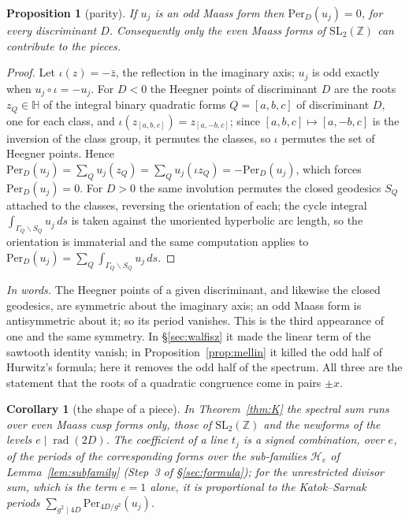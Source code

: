 \documentclass[11pt,a4paper]{article}
\newtheorem{proposition}[theorem]{Proposition}
\newtheorem{corollary}[theorem]{Corollary}
\theoremstyle{remark}\newtheorem{remark}[theorem]{Remark}
\newcommand{\Z}{\mathbb Z}\newcommand{\R}{\mathbb R}\newcommand{\Q}{\mathbb Q}\newcommand{\C}{\mathbb C}
\begin{document}
\begin{proposition}[parity]\label{prop:parity}
If $u_j$ is an odd Maass form then $\mathrm{Per}_D(u_j)=0$, for every discriminant $D$. Consequently only the even
Maass forms of $\mathrm{SL}_2(\Z)$ can contribute to the pieces.
\end{proposition}
\begin{proof}
Let $\iota(z)=-\bar z$, the reflection in the imaginary axis; $u_j$ is odd exactly when $u_j\circ\iota=-u_j$. For
$D<0$ the Heegner points of discriminant $D$ are the roots $z_Q\in\mathbb H$ of the integral binary quadratic forms
$Q=[a,b,c]$ of discriminant $D$, one for each class, and $\iota(z_{[a,b,c]})=z_{[a,-b,c]}$; since $[a,b,c]\mapsto[a,-b,c]$
is the inversion of the class group, it permutes the classes, so $\iota$ permutes the set of Heegner points. Hence
$\mathrm{Per}_D(u_j)=\sum_Qu_j(z_Q)=\sum_Qu_j(\iota z_Q)=-\mathrm{Per}_D(u_j)$, which forces
$\mathrm{Per}_D(u_j)=0$. For $D>0$ the same involution permutes the closed geodesics $S_Q$ attached to the classes,
reversing the orientation of each; the cycle integral $\int_{\Gamma_Q\backslash S_Q}u_j\,ds$ is taken against the
unoriented hyperbolic arc length, so the orientation is immaterial and the same computation applies to
$\mathrm{Per}_D(u_j)=\sum_Q\int_{\Gamma_Q\backslash S_Q}u_j\,ds$.
\end{proof}

\emph{In words.} The Heegner points of a given discriminant, and likewise the closed geodesics, are symmetric about
the imaginary axis; an odd Maass form is antisymmetric about it; so its period vanishes. This is the third appearance
of one and the same symmetry. In \S\ref{sec:walfisz} it made the linear term of the sawtooth identity vanish; in
Proposition~\ref{prop:mellin} it killed the odd half of Hurwitz's formula; here it removes the odd half of the
spectrum. All three are the statement that the roots of a quadratic congruence come in pairs $\pm x$.

\begin{corollary}[the shape of a piece]\label{cor:shape}
In Theorem~\ref{thm:K} the spectral sum runs over even Maass cusp forms only, those of $\mathrm{SL}_2(\Z)$ and the
newforms of the levels $e\mid\operatorname{rad}(2D)$. The coefficient of a line $t_j$ is a signed combination, over $e$,
of the periods of the corresponding forms over the sub-families $\mathcal H_e$ of Lemma~\ref{lem:subfamily} (Step~3 of
\S\ref{sec:formula}); for the unrestricted divisor sum, which is the term $e=1$ alone, it is proportional to the
Katok--Sarnak periods $\sum_{g^2\mid4D}\mathrm{Per}_{4D/g^2}(u_j)$.
\end{corollary}
\end{document}
